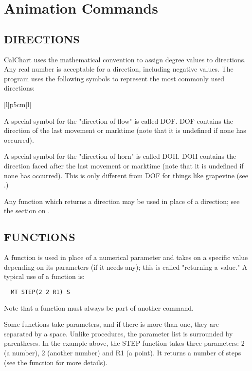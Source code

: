 \chapter{Animation Commands}\label{animcont}
\section{DIRECTIONS}\label{directions}

CalChart uses the mathematical convention to assign degree values to
directions.  Any real number is acceptable for a direction, including
negative values.  The program uses the following symbols to represent the
most commonly used directions:

\begin{tabular}{|l|p{5cm}|l|}\hline
{}\hline\hline
{}
\end{tabular}

A special symbol for the "direction of flow" is called DOF.  DOF contains
the direction of the last movement or marktime (note that it is undefined
if none has occurred).

A special symbol for the "direction of horn" is called DOH.  DOH contains
the direction faced after the last movement or marktime (note that it is
undefined if none has occurred).  This is only different from DOF for
things like grapevine (see .)

Any function which returns a direction may be used in place of a direction;
see the section on .


\section{FUNCTIONS}\label{functions}

A function is used in place of a numerical parameter and takes on a
specific value depending on its parameters (if it needs any); this is
called "returning a value."  A typical use of a function is:
\begin{verbatim}
  MT STEP(2 2 R1) S
\end{verbatim}
Note that a function must always be part of another command.

Some functions take parameters, and if there is more than one, they are
separated by a space.  Unlike procedures, the parameter list is surrounded
by parentheses.  In the example above, the STEP function takes three
parameters: 2 (a number), 2 (another number) and R1 (a point).  It returns
a number of steps (see the  function for more details).

